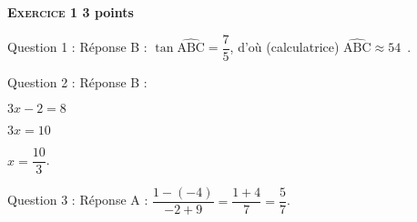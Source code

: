 \textbf{\textsc{Exercice 1} \hfill 3 points}

\medskip

Question 1 : Réponse B : $\tan \widehat{\text{ABC}} = \dfrac{7}{5}$, d'où (calculatrice) $\widehat{\text{ABC}} \approx 54$~\degres.

Question 2 : Réponse B : 

$3x-2 = 8$

$3x =10$

$x= \dfrac{10}{3}$.

Question 3 : Réponse A : $\dfrac{1- (- 4)}{- 2 + 9} = \dfrac{1 + 4}{7} = \dfrac{5}{7}$.

\vspace{0,5cm}

